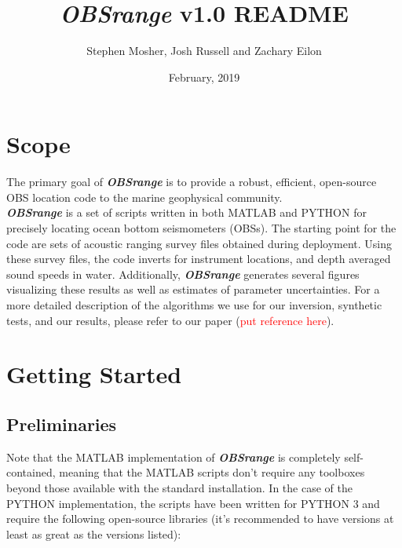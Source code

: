 \documentclass[titlepage, 12pt]{article}
\begin{document}
 \title{\textbf{\textit{\textit{\textbf{OBSrange}}}} v1.0 README}
 \author{Stephen Mosher, Josh Russell and Zachary Eilon}
 \date{February, 2019}
 \maketitle{}

 \tableofcontents
 \newpage

 \section{Scope}
   The primary goal of \textit{\textbf{OBSrange}} is to provide a robust, efficient, open-source OBS location code to the marine geophysical community.\\ 

   \textit{\textbf{OBSrange}} is a set of scripts written in both MATLAB and PYTHON for precisely locating ocean bottom seismometers (OBSs). The starting point for the code are sets of acoustic ranging survey files obtained during deployment. Using these survey files, the code inverts for instrument locations, and depth averaged sound speeds in water. Additionally, \textit{\textbf{OBSrange}} generates several figures visualizing these results as well as estimates of parameter uncertainties. For a more detailed description of the algorithms we use for our inversion, synthetic tests, and our results, please refer to our paper (\textcolor{red}{put reference here}).

 \section{Getting Started}
  
  \subsection{Preliminaries}
  Note that the MATLAB implementation of \textit{\textbf{OBSrange}} is completely self-contained, meaning that the MATLAB scripts don’t require any toolboxes beyond those available with the standard installation. In the case of the PYTHON implementation, the scripts have been written for PYTHON 3 and require the following open-source libraries (it’s recommended to have versions at least as great as the versions listed):
\end{document}
